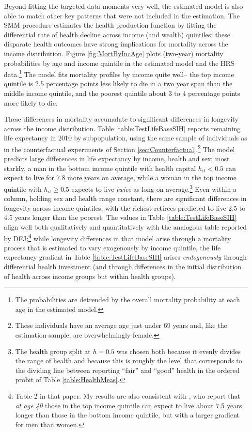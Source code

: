 \documentclass[12pt,pdftex,letterpaper]{article}
\newcommand{\Health}{h}
\begin{document}
Beyond fitting the targeted data moments very well, the estimated model is also able to match other key patterns that were not included in the estimation.  The SMM procedure estimates the health production function by fitting the differential rate of health decline across income (and wealth) quintiles; these disparate health outcomes have strong implications for mortality across the income distribution.  Figure \ref{fig:MortByIncAge} plots (two-year) mortality probabilities by age and income quintile in the estimated model and the HRS data.\footnote{The probabilities are detrended by the overall mortality probability at each age in the estimated model.}  The model fits mortality profiles by income quite well-- the top income quintile is 2.5 percentage points less likely to die in a two year span than the middle income quintile, and the poorest quintile about 3 to 4 percentage points more likely to die.

These differences in mortality accumulate to significant differences in longevity across the income distribution.  Table \ref{table:TestLifeBaseSIH} reports remaining life expectancy in 2010 by subpopulation, using the same sample of individuals as in the counterfactual experiments of Section \ref{sec:Counterfactual}.\footnote{These individuals have an average age just under 69 years and, like the estimation sample, are overwhelmingly female.}  The model predicts large differences in life expectancy by income, health and sex; most starkly, a man in the bottom income quintile with health capital $\Health_{it} < 0.5$ can expect to live for 7.8 more years on average, while a woman in the top income quintile with $\Health_{it} \geq 0.5$ expects to live \textit{twice} as long on average.\footnote{The health group split at $\Health=0.5$ was chosen both because it evenly divides the range of health and because this is roughly the level that corresponds to the dividing line between reporting ``fair'' and ``good'' health in the ordered probit of Table \ref{table:HealthMeas}.}  Even within a column, holding sex and health range constant, there are significant differences in longevity across income quintiles, with the richest retirees predicted to live 2.5 to 4.5 years longer than the poorest.  The values in Table \ref{table:TestLifeBaseSIH} align well both qualitatively and quantitatively with the analogous table reported by DFJ;\footnote{Table 2 in that paper.  My results are also consistent with \cite{chetty16}, who report that \textit{at age 40} those in the top income quintile can expect to live about 7.5 years longer than those in the bottom income quintile, but with a larger gradient for men than women.} while longevity differences in that model arise through a mortality process that is estimated to vary exogenously by income quintile, the life expectancy gradient in Table \ref{table:TestLifeBaseSIH} arises \textit{endogenously} through differential health investment (and through differences in the initial distribution of health across income groups but within health groups).
\end{document}
